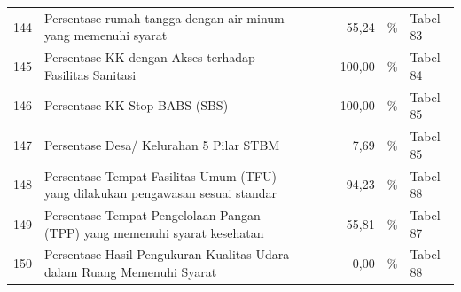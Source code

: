 \begin{small}
\begin{longtable}{rY{12em}rrrrY{5em}Y{5em}}
	144 & Persentase rumah tangga dengan air minum yang memenuhi syarat                                           &        &        &         &              55,24 & \%                             & Tabel 83 \\
	                  145 & Persentase KK dengan Akses terhadap Fasilitas Sanitasi                                                  &        &        &         &             100,00 & \%                             & Tabel 84 \\
	146 & Persentase KK Stop BABS (SBS)                                                                           &        &        &         &             100,00 & \%                             & Tabel 85 \\
	                  147 & Persentase Desa/ Kelurahan 5 Pilar STBM                                                                 &        &        &         &               7,69 & \%                             & Tabel 85 \\
	148 & Persentase Tempat Fasilitas Umum (TFU)  yang dilakukan pengawasan sesuai standar                        &        &        &         &              94,23 & \%                             & Tabel 88 \\
	                  149 & Persentase Tempat Pengelolaan Pangan (TPP) yang memenuhi syarat kesehatan                               &        &        &         &              55,81 & \%                             & Tabel 87 \\
	150 & Persentase Hasil Pengukuran Kualitas Udara dalam Ruang Memenuhi Syarat                                  &        &        &         &               0,00 & \%                             & Tabel 88
\end{longtable}%
\end{small}

